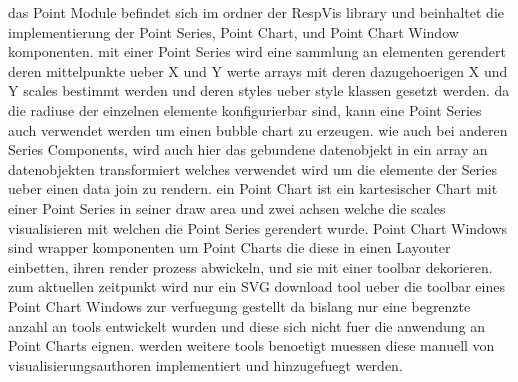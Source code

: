 das Point Module befindet sich im  ordner der RespVis library und beinhaltet die implementierung der Point Series, Point Chart, und Point Chart Window komponenten.
mit einer Point Series wird eine sammlung an  elementen gerendert deren mittelpunkte ueber X und Y werte arrays mit deren dazugehoerigen X und Y scales bestimmt werden und deren styles ueber style klassen gesetzt werden.
da die radiuse der einzelnen  elemente konfigurierbar sind, kann eine Point Series auch verwendet werden um einen bubble chart zu erzeugen.
wie auch bei anderen Series Components, wird auch hier das gebundene datenobjekt in ein array an datenobjekten transformiert welches verwendet wird um die elemente der Series ueber einen data join zu rendern.
ein Point Chart ist ein kartesischer Chart mit einer Point Series in seiner draw area und zwei achsen welche die scales visualisieren mit welchen die Point Series gerendert wurde.
Point Chart Windows sind wrapper komponenten um Point Charts die diese in einen Layouter einbetten, ihren render prozess abwickeln, und sie mit einer toolbar dekorieren.
zum aktuellen zeitpunkt wird nur ein SVG download tool ueber die toolbar eines Point Chart Windows zur verfuegung gestellt da bislang nur eine begrenzte anzahl an tools entwickelt wurden und diese sich nicht fuer die anwendung an Point Charts eignen.
werden weitere tools benoetigt muessen diese manuell von visualisierungsauthoren implementiert und hinzugefuegt werden.